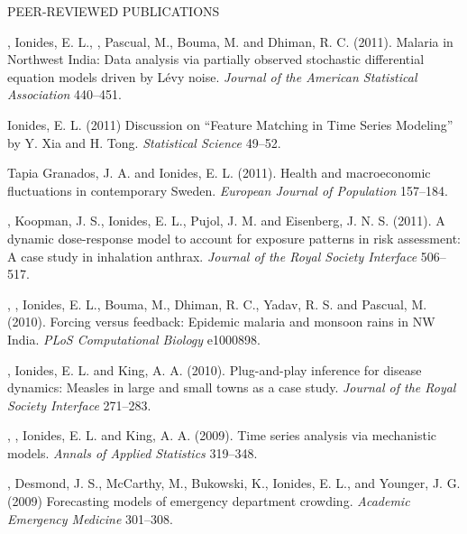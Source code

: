 \begin{reflist}{PEER-REVIEWED PUBLICATIONS}
\item\formal{[[\bhadraJASA] ]} , Ionides, E. L., , Pascual, M., Bouma, M. and Dhiman, R. C. (2011).
Malaria in Northwest India: Data analysis via partially observed stochastic differential equation models driven by L\'{e}vy noise. {\em Journal of the American Statistical Association} {}{\separator}440--451.

\item\formal{[[\ionidesSTATSCI] ]} Ionides, E. L. (2011) Discussion on ``Feature Matching in Time Series Modeling'' by Y. Xia and H. Tong.  {\em Statistical Science} {}{\separator}49--52.

\item\formal{[[\tapiaEJP] ]} Tapia Granados, J. A. and Ionides, E. L. (2011). Health and macroeconomic fluctuations in contemporary Sweden. {\em European Journal of Population} {}{\separator}157--184.



\item\formal{[[\mayerJRSI] ]} , Koopman, J. S., Ionides, E. L., Pujol, J. M. and  Eisenberg, J. N. S. (2011). A dynamic dose-response model to account for exposure patterns in risk assessment: A case study in inhalation anthrax. {\em Journal of the Royal Society Interface} {}{\separator}506--517.


\item\formal{[[\laneriPLOSCB] ]} , , Ionides, E. L., Bouma, M., Dhiman, R. C., Yadav, R. S. and Pascual, M. (2010).  Forcing versus feedback: Epidemic malaria and monsoon rains in NW India. {\em PLoS Computational Biology} {}{\separator}e1000898.

\item\formal{[[\heJRSI] ]}
, Ionides, E. L. and King, A. A. (2010).
Plug-and-play inference for disease dynamics: Measles in large and small towns as a case study. {\em Journal of the Royal Society Interface} {}{\separator}271--283.


\item\formal{[[\bretoAOAS] ]}
 ,  , Ionides, E. L. and King, A. A. (2009).
Time series analysis via mechanistic models. 
{\em Annals of Applied Statistics} {}{\separator}319--348.

\item\formal{[[\schweiglerAEM] ]}
, Desmond, J. S., McCarthy, M., Bukowski, K., Ionides, E. L., and Younger, J. G. (2009) Forecasting models of emergency department crowding. {\em Academic Emergency Medicine} {}{\separator}301--308.


\end{reflist}
